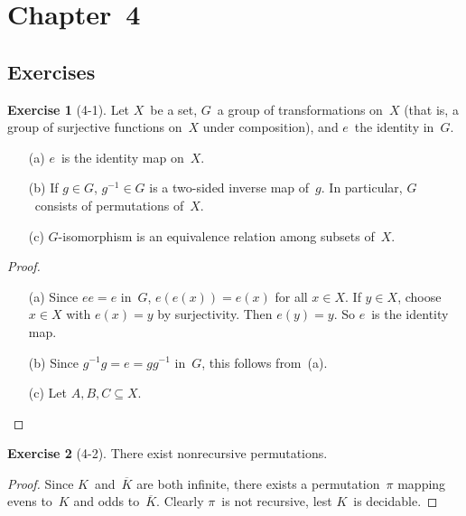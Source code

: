 \documentclass[letterpaper]{article}
\newcommand{\iso}{\equiv}
\newcommand{\comp}[1]{\overline{#1}}
\theoremstyle{definition}
\newtheorem*{exer}{Exercise}
\theoremstyle{remark}
\theoremstyle{direction}
\begin{document}
\newpage
\section*{Chapter~4}

\subsection*{Exercises}
\begin{exer}[4-1]
Let $X$~be a set, $G$~a group of transformations on~$X$ (that is, a group of surjective functions on~$X$ under composition), and $e$~the identity in~$G$.
\begin{enumerate}[itemsep=0pt]
\item[(a)] $e$~is the identity map on~$X$.
\item[(b)] If $g\in G$, $g^{-1}\in G$ is a two-sided inverse map of~$g$. In particular, $G$~consists of permutations of~$X$.
\item[(c)] $G$-isomorphism is an equivalence relation among subsets of~$X$.
\end{enumerate}
\end{exer}
\begin{proof}
\begin{enumerate}[itemsep=0pt]
\item[(a)] Since $ee=e$ in~$G$, $e(e(x))=e(x)$ for all $x\in X$. If $y\in X$, choose $x\in X$ with $e(x)=y$ by surjectivity. Then $e(y)=y$. So $e$~is the identity map.

\item[(b)] Since $g^{-1}g=e=gg^{-1}$ in~$G$, this follows from~(a).

\item[(c)] Let $A,B,C\subseteq X$.
\end{enumerate}
\end{proof}

\begin{exer}[4-2]
There exist nonrecursive permutations.
\end{exer}
\begin{proof}
Since $K$~and~$\comp{K}$ are both infinite, there exists a permutation~$\pi$ mapping evens to~$K$ and odds to~$\comp{K}$. Clearly $\pi$~is not recursive, lest $K$~is decidable.
\end{proof}
\end{document}
